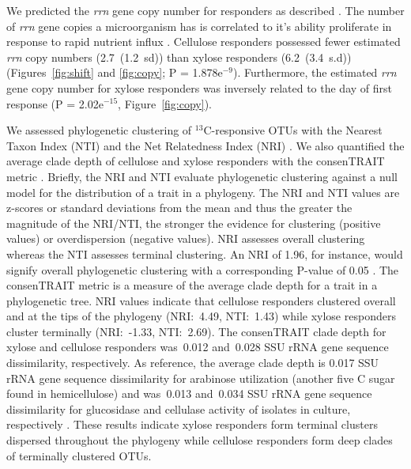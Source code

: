 We predicted the \textit{rrn} gene copy number for responders as described
\citep{Kembel_2012}. The number of \textit{rrn} gene copies a microorganism has
is correlated to it's ability proliferate in response to rapid nutrient influx
\citep{Klappenbach_2000}. Cellulose responders possessed fewer estimated
\textit{rrn} copy numbers (2.7~(1.2~sd)) than xylose responders (6.2~(3.4~s.d))
(Figures~\ref{fig:shift} and \ref{fig:copy}; P = 1.878e$^{-9}$). Furthermore,
the estimated \textit{rrn} gene copy number for xylose responders was inversely
related to the day of first response (P = 2.02e$^{-15}$,
Figure~\ref{fig:copy}).

We assessed phylogenetic clustering of $^{13}$C-responsive OTUs with the
Nearest Taxon Index (NTI) and the Net Relatedness Index (NRI)
\citep{Webb2000}. We also quantified the average clade depth of cellulose and
xylose responders with the consenTRAIT metric \citep{Martiny2013}. Briefly, the
NRI and NTI evaluate phylogenetic clustering against a null model for the
distribution of a trait in a phylogeny. The NRI and NTI values are z-scores or
standard deviations from the mean and thus the greater the magnitude of the
NRI/NTI, the stronger the evidence for clustering (positive values) or
overdispersion (negative values). NRI assesses overall clustering whereas the
NTI assesses terminal clustering. An NRI of 1.96, for instance, would signify
overall phylogenetic clustering with a corresponding P-value of 0.05
\citep{Evans2014a}. The consenTRAIT metric is a measure of the average clade
depth for a trait in a phylogenetic tree. NRI values indicate that cellulose
responders clustered overall and at the tips of the phylogeny (NRI:~4.49,
NTI:~1.43) while xylose responders cluster terminally (NRI:~-1.33, NTI:~2.69).
The consenTRAIT clade depth for xylose and cellulose responders was~0.012
and~0.028 SSU rRNA gene sequence dissimilarity, respectively. As reference, the
average clade depth is 0.017 SSU rRNA gene sequence dissimilarity for arabinose
utilization (another five C sugar found in hemicellulose) and was~0.013
and~0.034 SSU rRNA gene sequence dissimilarity for glucosidase and cellulase
activity of isolates in culture, respectively
\citep{Martiny2013,Berlemont2013}. These results indicate xylose responders
form terminal clusters dispersed throughout the phylogeny while cellulose
responders form deep clades of terminally clustered OTUs.
